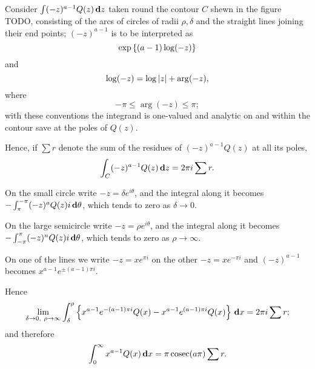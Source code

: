 %
%

Consider $\int (-z)^{a-1} Q(z) \, \mathbf{d} z$ taken round the contour
$C$ shewn in the figure TODO, consisting of the arcs of circles of
radii $\rho,\delta$ and the straight lines joining their end points;
$(-z)^{a-1}$ is
to be interpreted as
$$
\exp \left\{  ( a-1) \log (- z)  \right\}
$$
and
$$
\log (-z) = \log \left| z \right| + \arg (-z),
$$
where
$$
-\pi \leq \arg (-z) \leq \pi; %
$$
with these conventions the integrand is one-valued and analytic on and
within the contour save at the poles of $Q(z)$.

Hence, if $\sum r$ denote the sum of the residues of $(-z)^{a-1} Q(z)$
at all its poles,
$$
\int_{C} (-z)^{a-1} Q(z) \, \mathbf{d} z = 2 \pi i \sum r.
$$

On the small circle write $-z = \delta e^{i\theta}$, and the integral
along it becomes
$- \int_{\pi}^{-\pi} (-z)^{a} Q(z) i \, \mathbf{d} \theta$,
which tends to zero as $\delta \rightarrow 0$.

On the large semicircle write $-z = \rho e^{i\theta}$, and the
integral along it becomes $- \int_{-\pi}^{\pi} (-z)^{n} Q(z) i
\, \mathbf{d}\theta$, which tends to zero as $\rho \rightarrow \infty$.

On one of the lines we write $-z = x e^{\pi i}$ on the other
$-z = x e^{-\pi i}$ and $(-z)^{a-1}$ becomes $x^{a-1} e^{\pm (a-1) \pi i}$.

Hence
$$
\lim_{\delta\rightarrow 0,\ \rho\rightarrow\infty}
\int_{\delta}^{\rho}
\thebrace{
  x^{a-1} e^{-(a-1)\pi i} Q(x)
  -
  x^{a-1} e^{(a-1)\pi i} Q(x)
}
\dmeasure x
=
2 \pi i \sum r;
$$
and therefore
$$
\int_{0}^{\infty} x^{a-1} Q(x) \, \mathbf{d} x
=
\pi \operatorname{cosec} (a\pi) \sum r.
$$

